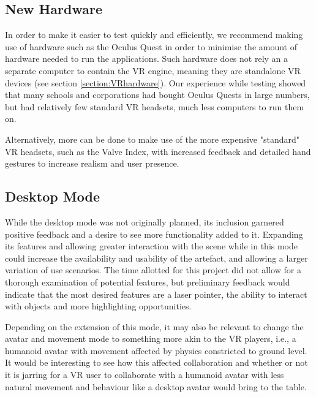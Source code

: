 \subsection{New Hardware}
In order to make it easier to test quickly and efficiently, we recommend making use of hardware such as the Oculus Quest \cite{hillmann2019comparing} in order to minimise the amount of hardware needed to run the applications. Such hardware does not rely an a separate computer to contain the VR engine, meaning they are standalone VR devices (see section \ref{section:VRhardware}). Our experience while testing showed that many schools and corporations had bought Oculus Quests in large numbers, but had relatively few standard VR headsets, much less computers to run them on. 

Alternatively, more can be done to make use of the more expensive "standard" VR headsets, such as the Valve Index, with increased feedback and detailed hand gestures to increase realism and user presence.

\subsection{Desktop Mode}
While the desktop mode was not originally planned, its inclusion garnered positive feedback and a desire to see more functionality added to it. Expanding its features and allowing greater interaction with the scene while in this mode could increase the availability and usability of the artefact, and allowing a larger variation of use scenarios. The time allotted for this project did not allow for a thorough examination of potential features, but preliminary feedback would indicate that the most desired features are a laser pointer, the ability to interact with objects and more highlighting opportunities.

Depending on the extension of this mode, it may also be relevant to change the avatar and movement mode to something more akin to the VR players, i.e., a humanoid avatar with movement affected by physics constricted to ground level. It would be interesting to see how this affected collaboration and whether or not it is jarring for a VR user to collaborate with a humanoid avatar with less natural movement and behaviour like a desktop avatar would bring to the table.

\cleardoublepage